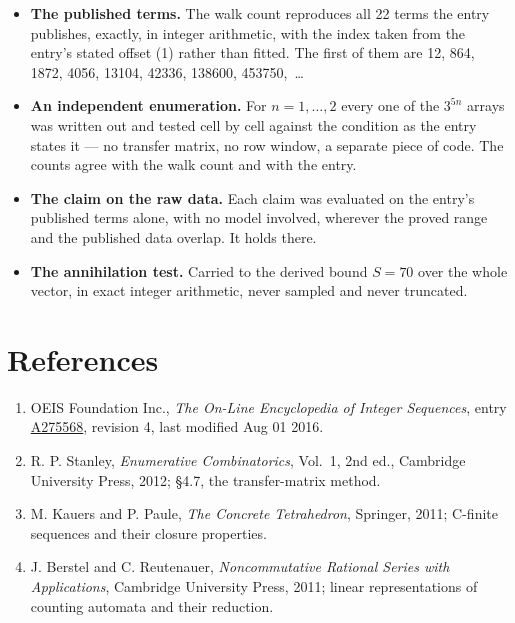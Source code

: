 \documentclass[11pt]{article}
\theoremstyle{definition}
\begin{document}
\begin{itemize}

\item {\bfseries The published terms.} The walk count reproduces all 22 terms the entry publishes, exactly, in integer arithmetic, with the index taken from the entry's stated offset (1) rather than fitted. The first of them are 12, 864, 1872, 4056, 13104, 42336, 138600, 453750,~\dots

\item {\bfseries An independent enumeration.} For $n = 1,\dots,2$ every one of the $3^{5n}$ arrays was written out and tested cell by cell against the condition as the entry states it --- no transfer matrix, no row window, a separate piece of code. The counts agree with the walk count and with the entry.

\item {\bfseries The claim on the raw data.} Each claim was evaluated on the entry's published terms alone, with no model involved, wherever the proved range and the published data overlap. It holds there.

\item {\bfseries The annihilation test.} Carried to the derived bound $S = 70$ over the whole vector, in exact integer arithmetic, never sampled and never truncated.

\end{itemize}

\section{References}

\begin{enumerate}

\item OEIS Foundation Inc., \emph{The On-Line Encyclopedia of Integer Sequences}, entry \href{https://oeis.org/A275568}{A275568}, revision 4, last modified Aug 01 2016.

\item R. P. Stanley, \emph{Enumerative Combinatorics}, Vol.~1, 2nd ed., Cambridge University Press, 2012; \S4.7, the transfer-matrix method.

\item M. Kauers and P. Paule, \emph{The Concrete Tetrahedron}, Springer, 2011; C-finite sequences and their closure properties.

\item J. Berstel and C. Reutenauer, \emph{Noncommutative Rational Series with Applications}, Cambridge University Press, 2011; linear representations of counting automata and their reduction.

\end{enumerate}
\end{document}
